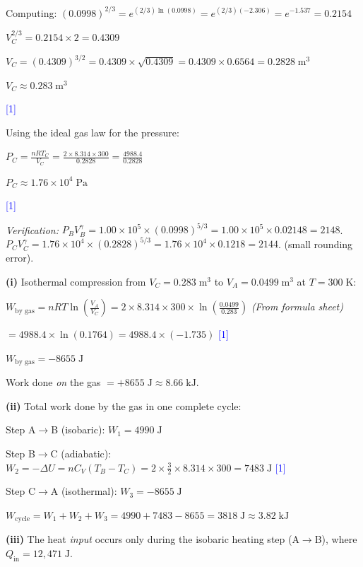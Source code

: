 \documentclass[12pt,a4paper]{article}
\newcommand{\markstep}[1]{\hfill\textcolor{blue}{[#1]}}
\newcommand{\finalanswer}[1]{%
  \begin{tcolorbox}[colback=green!5!white,colframe=green!50!black,boxrule=0.5pt]
  #1
  \end{tcolorbox}
}
\newcommand{\fromsheet}{\textit{(From formula sheet)}}
\begin{document}
\begin{parts}
Computing: $(0.0998)^{2/3} = e^{(2/3)\ln(0.0998)} = e^{(2/3)(-2.306)} = e^{-1.537} = 0.2154$

$V_C^{2/3} = 0.2154 \times 2 = 0.4309$

$V_C = (0.4309)^{3/2} = 0.4309\times\sqrt{0.4309} = 0.4309\times 0.6564 = 0.2828\;\text{m}^3$

\finalanswer{$V_C \approx 0.283\;\text{m}^3$} \markstep{1}

Using the ideal gas law for the pressure:

$P_C = \frac{nRT_C}{V_C} = \frac{2\times 8.314\times 300}{0.2828} = \frac{4988.4}{0.2828}$

\finalanswer{$P_C \approx 1.76\times 10^4\;\text{Pa}$} \markstep{1}

\textit{Verification:} $P_B V_B^\gamma = 1.00\times 10^5\times(0.0998)^{5/3} = 1.00\times 10^5\times 0.02148 = 2148$. $P_C V_C^\gamma = 1.76\times 10^4\times(0.2828)^{5/3} = 1.76\times 10^4\times 0.1218 = 2144$. \checkmark{} (small rounding error).

\item \textbf{(i)} Isothermal compression from $V_C = 0.283\;\text{m}^3$ to $V_A = 0.0499\;\text{m}^3$ at $T = 300\;\text{K}$:

$W_{\text{by gas}} = nRT\ln\!\left(\frac{V_A}{V_C}\right) = 2\times 8.314\times 300\times\ln\!\left(\frac{0.0499}{0.283}\right)$ \fromsheet

$= 4988.4\times\ln(0.1764) = 4988.4\times(-1.735)$ \markstep{1}

$W_{\text{by gas}} = -8655\;\text{J}$

Work done \emph{on} the gas $= +8655\;\text{J} \approx 8.66\;\text{kJ}$.

\textbf{(ii)} Total work done by the gas in one complete cycle:

Step A$\to$B (isobaric): $W_1 = 4990\;\text{J}$

Step B$\to$C (adiabatic): $W_2 = -\Delta U = nC_V(T_B - T_C) = 2\times\frac{3}{2}\times 8.314\times 300 = 7483\;\text{J}$ \markstep{1}

Step C$\to$A (isothermal): $W_3 = -8655\;\text{J}$

\finalanswer{$W_{\text{cycle}} = W_1 + W_2 + W_3 = 4990 + 7483 - 8655 = 3818\;\text{J} \approx 3.82\;\text{kJ}$}

\textbf{(iii)} The heat \emph{input} occurs only during the isobaric heating step (A$\to$B), where $Q_{\text{in}} = 12{,}471\;\text{J}$.


\end{parts}
\end{document}
